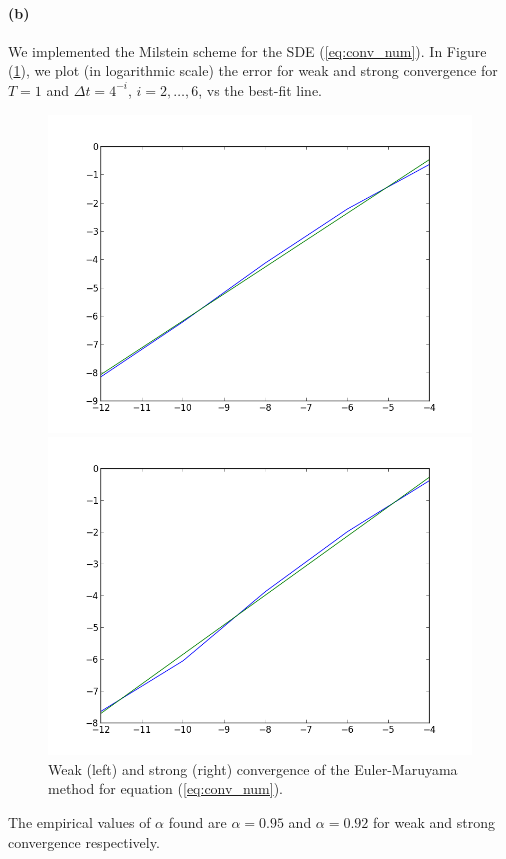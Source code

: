 \documentclass[a4paper,11pt]{article}
\theoremstyle{definition}
\theoremstyle{plain}
\theoremstyle{remark}
\begin{document}
\paragraph*{(b)}

We implemented the Milstein scheme for the SDE (\ref{eq:conv_num}).
In Figure (\ref{figure:ex10_mil}), we plot (in logarithmic scale) the error for weak and strong convergence for $T=1$ and $\Delta t = 4^{-i}$, $i=2,\dots,6$, vs the best-fit line.
\begin{figure}[htbp]
\centering
\begin{minipage}[c]{.47\textwidth}
\includegraphics[width=\textwidth,
keepaspectratio]{ex10_mil_w.png}
\end{minipage}
\hspace{4mm}
\begin{minipage}[c]{.47\textwidth}
\includegraphics[width=\textwidth,
keepaspectratio]{ex10_mil_s.png}
\end{minipage}
\caption{ \label{figure:ex10_mil} Weak (left) and strong (right) convergence of the Euler-Maruyama method for equation (\ref{eq:conv_num}).}
\end{figure}
The empirical values of $\alpha$ found are $\alpha = 0.95$ and $\alpha = 0.92$ for weak and strong convergence respectively.
\end{document}
